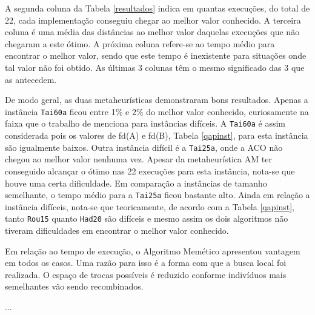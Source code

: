 A segunda coluna da Tabela \ref{resultados} indica em quantas
execuções, do total de 22, cada implementação conseguiu chegar ao
melhor valor conhecido. A terceira coluna é uma média das distâncias
ao melhor valor daquelas execuções que não chegaram a este ótimo. A
próxima coluna refere-se ao tempo médio para encontrar o melhor valor,
sendo que este tempo é inexistente para situações onde tal valor não
foi obtido. As últimas 3 colunas têm o mesmo significado das 3 que as
antecedem.

De modo geral, as duas metaheurísticas demonstraram bons
resultados. Apenas a instância \verb!Tai60a! ficou entre 1\% e 2\% do
melhor valor conhecido, curiosamente na faixa que o trabalho de
\cite{taillard1} menciona para instâncias difíceis. A \verb!Tai60a! é
assim considerada pois os valores de fd(A) e fd(B), Tabela
\ref{qapinst}, para esta instância são igualmente baixos.
Outra instância difícil é a \verb!Tai25a!, onde a ACO não chegou ao
melhor valor nenhuma vez. Apesar da metaheurística AM ter conseguido
alcançar o ótimo nas 22 execuções para esta instância, nota-se que
houve uma certa dificuldade. Em comparação a instâncias de tamanho
semelhante, o tempo médio para a \verb!Tai25a! ficou bastante alto.
Ainda em relação a instância difíceis, nota-se que teoricamente, de
acordo com a Tabela \ref{qapinst}, tanto \verb!Rou15! quanto
\verb!Had20! são difíceis e mesmo assim os dois algoritmos não tiveram
dificuldades em encontrar o melhor valor conhecido.

Em relação ao tempo de execução, o Algoritmo Memético apresentou
vantagem em todos os casos. Uma razão para isso é a forma com que a
busca local foi realizada. O espaço de trocas possíveis é reduzido
conforme indivíduos mais semelhantes vão sendo recombinados.

...
